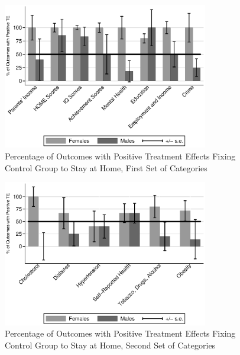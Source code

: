 \documentclass[static]{JJH-Beamer}
\begin{document}
\begin{frame}

\begin{figure}[H]
\caption{Percentage of Outcomes with Positive Treatment Effects Fixing Control Group to Stay at Home, First Set of Categories}
\begin{center}
\includegraphics[width=0.8\textwidth]{output/epan_ipw_p0_cats1}
\end{center}
\end{figure}

\end{frame}

\begin{frame}

\begin{figure}[H]
\caption{Percentage of Outcomes with Positive Treatment Effects Fixing Control Group to Stay at Home, Second Set of Categories}
\begin{center}
\includegraphics[width=0.8\textwidth]{output/epan_ipw_p0_cats2}
\end{center}
\end{figure}

\end{frame}
\end{document}
